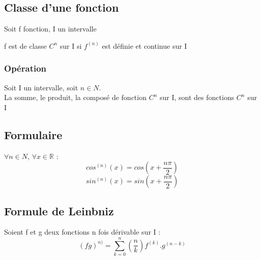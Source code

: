 \subsection{Classe d'une fonction}
Soit f fonction, I un intervalle
\begin{de}
f est de classe $C^n$ sur I si $f^{(n)}$ est définie et continue sur I
\end{de}
\subsubsection{Opération}
\begin{prop}
Soit I un intervalle, soit $n \in N$.\\
La somme, le produit, la composé de fonction $C^n$ sur I, sont des fonctions $C^n$ sur I
\end{prop}
\subsection{Formulaire}
$\forall n \in N$, $\forall x \in \mathbb{R}$ :
$$cos^{(n)}(x) = cos(x+\dfrac{n\pi}{2})$$
$$sin^{(n)}(x) = sin(x+\dfrac{n\pi}{2})$$
\subsection{Formule de Leinbniz}
Soient f et g deux fonctions n fois dérivable sur I :
$$(fg)^{n)} = \sum_{k=0}^n \left( \dfrac{n}{k}\right) f^{(k)}.g^{(n-k)}$$
